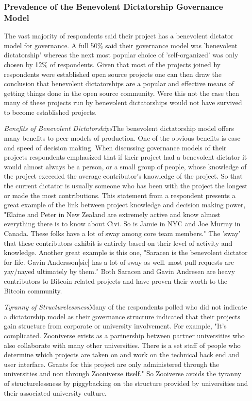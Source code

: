 \subsubsection{Prevalence of the Benevolent Dictatorship Governance Model}

The vast majority of respondents said their project has a benevolent dictator model for governance.  A full 50\% said their governance model was 'benevolent dictatorship' whereas the next most popular choice of 'self-organized' was only chosen by 12\% of respondents.  Given that most of the projects joined by respondents were established open source projects one can then draw the conclusion that benevolent dictatorships are a popular and effective means of getting things done in the open source community.  Were this not the case then many of these projects run by benevolent dictatorships would not have survived to become established projects.

{\it Benefits of Benevolent Dictatorships}The benevolent dictatorship model offers many benefits to peer models of production.  One of the obvious benefits is ease and speed of decision making.  When discussing governance models of their projects respondents emphasized that if their project had a benevolent dictator it would almost always be a person, or a small group of people, whose knowledge of the project exceeded the average contributor's knowledge of the project.  So that the current dictator is usually someone who has been with the project the longest or made the most contributions.  This statement from a respondent presents a great example of the link between project knowledge and decision making power, "Elaine and Peter in New Zealand are extremely active and know almost everything there is to know about Civi. So is Jamie in NYC and Joe Murray in Canada. These folks have a lot of sway among core team members."  The 'sway' that these contributors exhibit is entirely based on their level of activity and knowledge.  Another great example is this one, "Saracen is the benevolent dictator for life. Gavin Andersson[sic] has a lot of sway as well. most pull requests are yay/nayed ultimately by them."  Both Saracen and Gavin Andresen are heavy contributors to Bitcoin related projects and have proven their worth to the Bitcoin community.

{\it Tyranny of Structurelessness}Many of the respondents polled who did not indicate a dictatorship model as their governance structure indicated that their projects gain structure from corporate or university involvement.  For example, "It's complicated. Zooniverse exists as a partnership between partner universities who also collaborate with many other universities. There is a set staff of people who determine which projects are taken on and work on the technical back end and user interface. Grants for this project are only administered through the universities and non through Zooniverse itself."  So Zooiverse avoids the tyranny of structurelessness by piggybacking on the structure provided by universities and their associated university culture.

